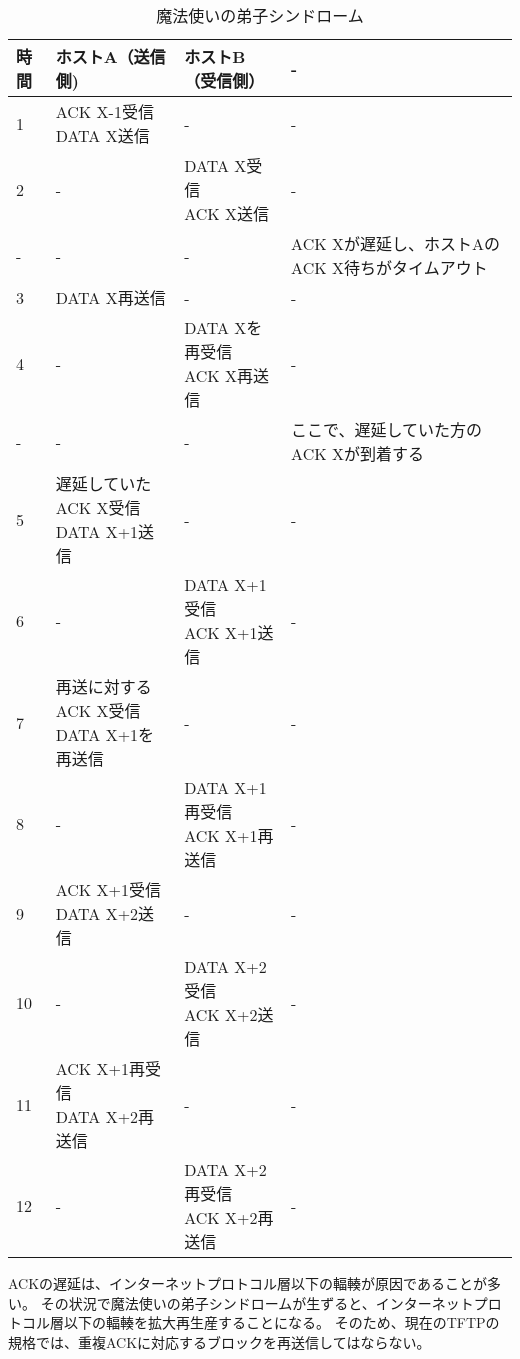 \begin{table}[hbtp] \caption{魔法使いの弟子シンドローム} \label{rfc1123}
\begin{center}
{\footnotesize
	\begin{tabularx}{13cm}{lllX} \toprule
	時間 & ホストA（送信側) & ホストB（受信側） & - \\ \midrule
	1 & \shortstack{ ACK X-1受信 \\ DATA X送信} & - & - \\ \hline	
	2 & -  & \shortstack{ DATA X受信 \\ ACK X送信}  & - \\ \hline
	- & - & - & ACK Xが遅延し、ホストAのACK X待ちがタイムアウト\\ \hline
	3 & DATA X再送信 & - & - \\ \hline
	4 & - & \shortstack{DATA Xを再受信 \\ ACK X再送信} & - \\ \hline
	- & - & - & ここで、遅延していた方のACK Xが到着する \\ \hline
	5 & \shortstack{遅延していた ACK X受信 \\ DATA X+1送信} & - & - \\ \hline 	
	6 & - & \shortstack{ DATA X+1受信 \\ ACK X+1送信} & - \\ \hline
	7 & \shortstack{再送に対する ACK X受信 \\ DATA X+1を再送信} & - & - \\ \hline 	
	8 & - & \shortstack{DATA X+1再受信 \\ ACK X+1再送信} & - \\ \hline
	9  & \shortstack{ACK X+1受信 \\ DATA X+2送信} & - & - \\ \hline 	
	10 & - & \shortstack{DATA X+2受信 \\ ACK X+2送信} & - \\ \hline
	11 & \shortstack{ACK X+1再受信 \\ DATA X+2再送信} & - & - \\ \hline 	
	12 & - & \shortstack{DATA X+2再受信 \\ ACK X+2再送信} & - \\ \bottomrule
	\end{tabularx}
}
\end{center}
\end{table}


ACKの遅延は、インターネットプロトコル層以下の輻輳が原因であることが多い。
その状況で魔法使いの弟子シンドロームが生ずると、インターネットプロトコル層以下の輻輳を拡大再生産することになる。
そのため、現在のTFTPの規格では、重複ACKに対応するブロックを再送信してはならない。